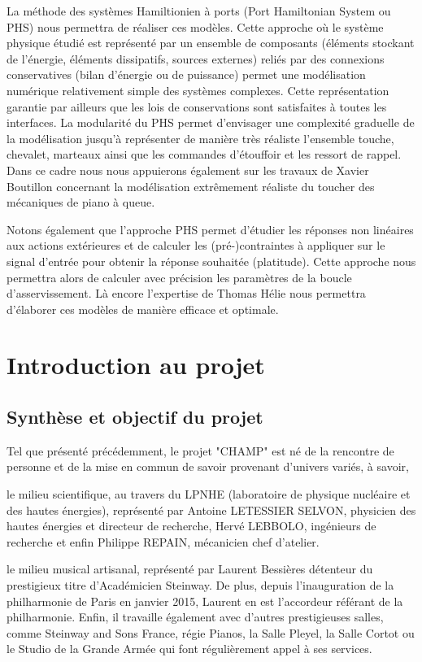 \documentclass[french,a4paper,12pt]{report}
\begin{document}
La méthode des systèmes Hamiltionien à ports (Port Hamiltonian System ou PHS) nous permettra de réaliser ces modèles. Cette approche où le système physique étudié est représenté par un ensemble de composants (éléments stockant de l’énergie, éléments dissipatifs, sources externes) reliés par des connexions conservatives (bilan d’énergie ou de puissance) permet une modélisation numérique relativement simple des systèmes complexes. Cette représentation garantie par ailleurs que les lois de conservations sont satisfaites à toutes les interfaces. La modularité du PHS permet d’envisager une complexité graduelle de la modélisation jusqu’à représenter de manière très réaliste l’ensemble touche, chevalet, marteaux ainsi que les commandes d’étouffoir et les ressort de rappel. Dans ce cadre nous nous appuierons également sur les travaux de Xavier Boutillon concernant la modélisation extrêmement réaliste du toucher des mécaniques de piano à queue.

Notons également que l’approche PHS permet d’étudier les réponses non linéaires aux actions extérieures et de calculer les (pré-)contraintes à appliquer sur le signal d’entrée pour obtenir la réponse souhaitée (platitude). Cette approche nous permettra alors de calculer avec précision les paramètres de la boucle d’asservissement. Là encore l’expertise de Thomas Hélie nous permettra d’élaborer ces modèles de manière efficace et optimale.

	\chapter{Introduction au projet}
	
	\section{Synthèse et objectif du projet}
	
	Tel que présenté précédemment, le projet "CHAMP" est né de la rencontre de personne et de la mise en commun de savoir provenant d'univers variés, à savoir, 
	
	le milieu scientifique, au travers du LPNHE (laboratoire de physique nucléaire et des hautes énergies), représenté par Antoine LETESSIER SELVON, physicien des hautes énergies et directeur de recherche, Hervé LEBBOLO, ingénieurs de recherche et enfin Philippe REPAIN, mécanicien chef d'atelier.
	
	le milieu musical artisanal, représenté par Laurent Bessières détenteur du prestigieux titre d'Académicien Steinway.
	De plus, depuis l'inauguration de la philharmonie de Paris en janvier 2015, Laurent en est l'accordeur référant de la philharmonie. Enfin, il travaille également avec d'autres prestigieuses salles, comme Steinway and Sons France, régie Pianos, la Salle Pleyel, la Salle Cortot ou le Studio de la Grande Armée qui font régulièrement appel à ses services.	
	
\end{document}

